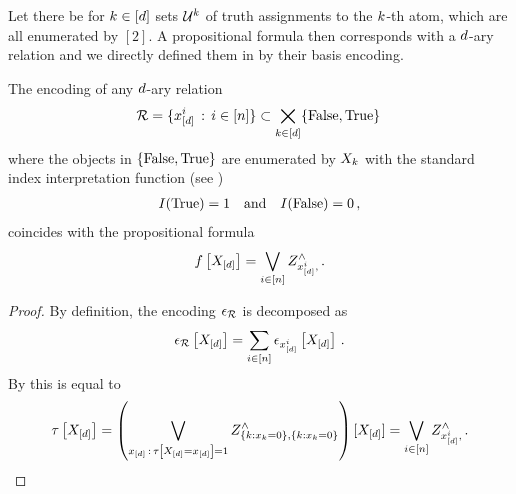 Let there be for $k\in[d]$ sets $\mathcal{U}^{k}$ of truth assignments to the $k$-th atom, which are all enumerated by $[2]$.
A propositional formula then corresponds with a $d$-ary relation and we directly defined them in  by their basis encoding.


\begin{theorem}
    The encoding of any $d$-ary relation
    \begin{align*}
        \mathcal{R} = \{ x_{[d]}^{i} \, : \, i\in[n] \} \subset \bigtimes_{k\in[d]} \{\mathrm{False},\mathrm{True}\} \,
    \end{align*}
    where the objects in $\{\mathrm{False},\mathrm{True}\}$ are enumerated by $X_{k}$ with the standard index interpretation function (see )
    \begin{align*}
        I(\mathrm{True}) = 1 \quad \text{and} \quad I(\mathrm{False}) = 0 \, ,
    \end{align*}
    coincides with the propositional formula
    \begin{align*}
        f\left[X_{[d]}\right] = \bigvee_{i\in[n]} Z^{\land}_{x_{[d]}^{i},\,} .
    \end{align*}
\end{theorem}
\begin{proof}
    By definition, the encoding $\epsilon_{\mathcal{R}}$ is decomposed as
    \begin{align*}
        \epsilon_{\mathcal{R}}\left[X_{[d]}\right]
        = \sum_{i\in[n]} \epsilon_{x_{[d]}^{i}}\left[X_{[d]}\right] \, .
    \end{align*}
    By  this is equal to
    \begin{align*}
        \tau\left[X_{[d]}\right] = \left( \bigvee_{x_{[d]} \, : \, \tau\left[X_{[d]}=x_{[d]}\right] = 1}
        Z^{\land}_{\{k : x_{k}=0\},\{k : x_{k}=0\}}
        \right)[X_{[d]}]
        = \bigvee_{i\in[n]} Z^{\land}_{x_{[d]}^{i},\,} .
    \end{align*}
\end{proof}


